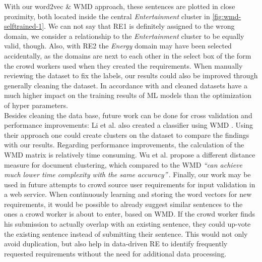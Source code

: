 With our word2vec \& WMD approach, these sentences are plotted in close proximity, both located inside the central \emph{Entertainment} cluster in \autoref{fig:wmd-selftrained-1}. We can not say that RE1 is definitely assigned to the wrong domain, we consider a relationship to the \emph{Entertainment} cluster to be equally valid, though. Also, with RE2 the \emph{Energy} domain may have been selected accidentally, as the domains are next to each other in the select box of the form the crowd workers used when they created the requirements. When manually reviewing the dataset to fix the labels, our results could also be improved through generally cleaning the dataset. In accordance with \cite{chu_data_2016} and \cite{krishnan_data_2016} cleaned datasets have a much higher impact on the training results of ML models than the optimization of hyper parameters.\\

Besides cleaning the data base, future work can be done for cross validation and performance improvements: Li et al. also created a classifier using WMD \cite{li_classifying_2019}. Using their approach one could create clusters on the \crowdre{} dataset to compare the findings with our results. Regarding performance improvements, the calculation of the WMD matrix is relatively time consuming. Wu et al. propose a different distance measure for document clustering, which compared to the WMD \textit{``can achieve much lower time complexity with the same accuracy''}\,\cite{wu_topic_2017}. Finally, our work may be used in future attempts to crowd source user requirements for input validation in a web service. When continuously learning and storing the word vectors for new requirements, it would be possible to already suggest similar sentences to the ones a crowd worker is about to enter, based on WMD. If the crowd worker finds his submission to actually overlap with an existing sentence, they could up-vote the existing sentence instead of submitting their sentence. This would not only avoid duplication, but also help in data-driven RE to identify frequently requested requirements without the need for additional data processing.\\[2cm]